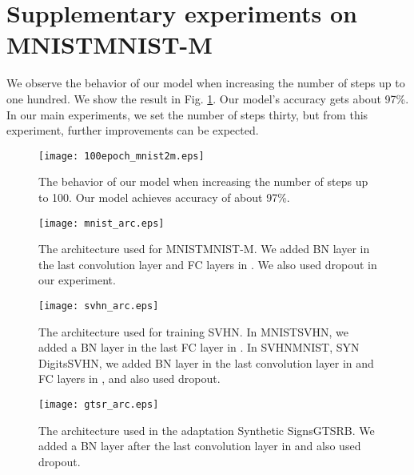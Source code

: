 \documentclass{article}
\begin{document}
\section*{Supplementary experiments on MNISTMNIST-M}
We observe the behavior of our model when increasing the number of steps up to one hundred. We show the result in Fig. \ref{fig:100epoch}. Our model's accuracy gets about 97\%. In our main experiments, we set the number of steps thirty, but from this experiment, further improvements can be expected.
\begin{figure}[t]
  \begin{center}
   \texttt{[image: 100epoch\_mnist2m.eps]}
  \end{center}
\caption{The behavior of our model when increasing the number of steps up to 100. Our model achieves accuracy of about 97\%.}
    \label{fig:100epoch}
\end{figure}

\begin{figure*}[t]
  \begin{center}
   \texttt{[image: mnist\_arc.eps]}
  \end{center}
\caption{The architecture used for MNISTMNIST-M. We added BN layer in the last convolution layer and FC layers in . We also used dropout in our experiment.}
    \label{fig:mnist_arc}
\end{figure*}

\begin{figure*}[t]
  \begin{center}
   \texttt{[image: svhn\_arc.eps]}
  \end{center}
\caption{The architecture used for training SVHN. In MNISTSVHN, we added a BN layer in the last FC layer in . In SVHNMNIST, SYN DigitsSVHN, we added BN layer in the last convolution layer in  and FC layers in , and also used dropout.}
    \label{fig:svhn_arc}
\end{figure*}

\begin{figure*}[t]
  \begin{center}
   \texttt{[image: gtsr\_arc.eps]}
  \end{center}
\caption{The architecture used in the adaptation Synthetic SignsGTSRB. We added a BN layer after the last convolution layer in  and also used dropout.}
    \label{fig:gtsr_arc}
\end{figure*}
\end{document}
